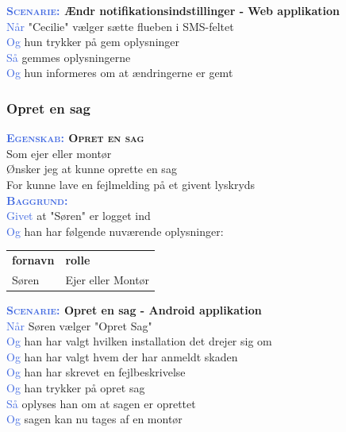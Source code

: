 \textbf{\textsc{\textcolor{RoyalBlue}{Scenarie:}} Ændr notifikationsindstillinger - Web applikation}\\
\textcolor{RoyalBlue}{Når} "Cecilie" vælger sætte flueben i SMS-feltet\\
\textcolor{RoyalBlue}{Og} hun trykker på gem oplysninger\\
\textcolor{RoyalBlue}{Så} gemmes oplysningerne\\
\textcolor{RoyalBlue}{Og} hun informeres om at ændringerne er gemt\\

\subsubsection{Opret en sag}\label{sec:USOpretSag}
\textbf{\textsc{\textcolor{RoyalBlue}{Egenskab:} Opret en sag}}\\
Som ejer eller montør\\
Ønsker jeg at kunne oprette en sag\\
For kunne lave en fejlmelding på et givent lyskryds\\

\textsc{\textcolor{RoyalBlue}{\textbf{Baggrund:}}}\\
\textcolor{RoyalBlue}{Givet} at "Søren" er logget ind\\
\textcolor{RoyalBlue}{Og} han har følgende nuværende oplysninger:\\
\begin{tabular}{| l | l |}
	\textbf{fornavn} & \textbf{rolle} \\
	Søren & Ejer eller Montør\\
\end{tabular}
\clearpage

\textbf{\textsc{\textcolor{RoyalBlue}{Scenarie:}} Opret en sag - Android applikation}\\
\textcolor{RoyalBlue}{Når} Søren vælger "Opret Sag"\\
\textcolor{RoyalBlue}{Og} han har valgt hvilken installation det drejer sig om\\
\textcolor{RoyalBlue}{Og} han har valgt hvem der har anmeldt skaden\\
\textcolor{RoyalBlue}{Og} han har skrevet en fejlbeskrivelse \\
\textcolor{RoyalBlue}{Og} han trykker på opret sag \\
\textcolor{RoyalBlue}{Så} oplyses han om at sagen er oprettet\\
\textcolor{RoyalBlue}{Og} sagen kan nu tages af en montør\\

